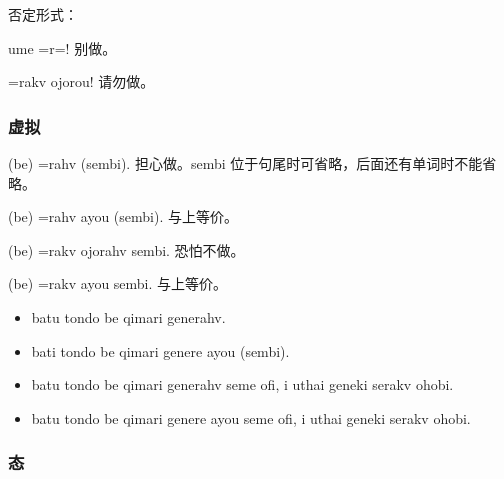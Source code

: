 否定形式：

\begin{des}
    \item[ume \V=r=\AIfina !] 别做\V 。
    \item[\V=rakv ojorou!] 请勿做\V 。 
\end{des}

\subsubsection{虚拟}

\begin{des}
    \item[\A \B (be) \V=rahv (sembi).] \A 担心\B 做\V 。sembi 位于句尾时可省略，后面还有单词时不能省略。
    \item[\A \B (be) \V=rahv ayou (sembi).] 与上等价。
    \item[\A \B (be) \V=rakv ojorahv sembi.]  \A 恐怕\B 不做\V 。
    \item[\A \B (be) \V=rakv ayou sembi.] 与上等价。 
    \begin{itemize}
        \item batu tondo be qimari generahv.
        \item bati tondo be qimari genere ayou (sembi).
        \item batu tondo be qimari generahv seme ofi, i uthai geneki serakv ohobi.
        \item batu tondo be qimari genere ayou seme ofi, i uthai geneki serakv ohobi.
    \end{itemize}
\end{des}

\subsubsection{态}


